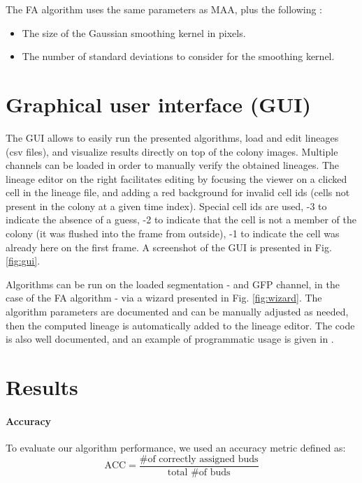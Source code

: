 \documentclass{TP}
\begin{document}
The FA algorithm uses the same parameters as MAA, plus the following : 
\begin{itemize}
\setlength\itemsep{0.0em}
    \item The size of the Gaussian smoothing kernel in pixels.
    \item The number of standard deviations to consider for the smoothing kernel.
\end{itemize}

\section{Graphical user interface (GUI)}

The GUI allows to easily run the presented algorithms, load and edit lineages (csv files), and visualize results directly on top of the colony images. Multiple channels can be loaded in order to manually verify the obtained lineages. The lineage editor on the right facilitates editing by focusing the viewer on a clicked cell in the lineage file, and adding a red background for invalid cell ids (cells not present in the colony at a given time index). Special cell ids are used, -3 to indicate the absence of a guess, -2 to indicate that the cell is not a member of the colony (it was flushed into the frame from outside), -1 to indicate the cell was already here on the first frame. A screenshot of the GUI is presented in Fig. \ref{fig:gui}.

Algorithms can be run on the loaded segmentation - and GFP channel, in the case of the FA algorithm - via a wizard presented in Fig. \ref{fig:wizard}. The algorithm parameters are documented and can be manually adjusted as needed, then the computed lineage is automatically added to the lineage editor. The code is also well documented, and an example of programmatic usage is given in \cite{lien github}.


\section{Results}

\paragraph{Accuracy} To evaluate our algorithm performance, we used an accuracy metric defined as: \begin{equation*}
    \text{ACC} = \frac{\text{\# of correctly assigned buds}}{\text{total \# of buds}}
\end{equation*}
\end{document}
